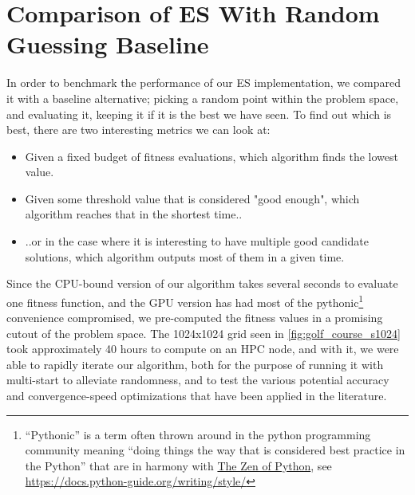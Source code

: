\section{Comparison of ES With Random Guessing Baseline}
In order to benchmark the performance of our ES implementation, we compared it with a baseline alternative; picking a random point within the problem space, and evaluating it, keeping it if it is the best we have seen. To find out which is best, there are two interesting metrics we can look at: 
\begin{itemize}
    \item Given a fixed budget of fitness evaluations, which algorithm finds the lowest value.
    \item Given some threshold value that is considered "good enough", which algorithm reaches that in the shortest time..
    \item ..or in the case where it is interesting to have multiple good candidate solutions, which algorithm outputs most of them in a given time.
\end{itemize}
Since the CPU-bound version of our algorithm takes several seconds to evaluate one fitness function, and the GPU version has had most of the pythonic\footnote{``Pythonic'' is a term often thrown around in the python programming community meaning ``doing things the way that is considered best practice in the Python'' that are in harmony with \href{https://www.python.org/dev/peps/pep-0020/}{The Zen of Python}, see \url{https://docs.python-guide.org/writing/style/}} convenience compromised, we pre-computed the fitness values in a promising cutout of the problem space. The 1024x1024 grid seen in \cref{fig:golf_course_s1024} took approximately 40 hours to compute on an HPC node, and with it, we were able to rapidly iterate our algorithm, both for the purpose of running it with multi-start to alleviate randomness, and to test the various potential accuracy and convergence-speed optimizations that have been applied in the literature.
